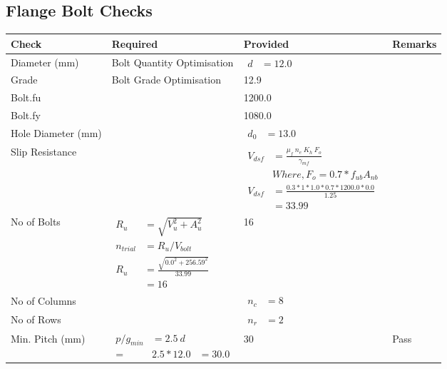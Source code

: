 \documentclass{article}%
\begin{document}
\subsection{Flange Bolt Checks}%
\label{subsec:FlangeBoltChecks}%
\renewcommand{\arraystretch}{1.2}%
\begin{longtable}{|p{4cm}|p{5cm}|p{5.5cm}|p{1.5cm}|}%
\hline%
\rowcolor{OsdagGreen}%
Check&Required&Provided&Remarks\\%
\hline%
\endhead%
\hline%
Diameter (mm)&Bolt Quantity Optimisation&$\begin{aligned} d &=12.0\end{aligned}$&\\%
\hline%
Grade&Bolt Grade Optimisation&12.9&\\%
\hline%
Bolt.fu&&1200.0&\\%
\hline%
Bolt.fy&&1080.0&\\%
\hline%
Hole Diameter (mm)& &$\begin{aligned} d_0 &=13.0\end{aligned}$&\\%
\hline%
Slip Resistance&&$\begin{aligned}V_{dsf} & = \frac{\mu_f~ n_e~  K_h~ F_o}{\gamma_{mf}}\\ & Where, F_o = 0.7 * f_{ub} A_{nb}\\ V_{dsf} & = \frac{0.3*1*1.0* 0.7 *1200.0*0.0}{1.25}\\ & =33.99\end{aligned}$&\\%
\hline%
No of Bolts&$\begin{aligned}R_{u} &= \sqrt{V_u^2+A_u^2}\\ n_{trial} &= R_u/ V_{bolt}\\ R_{u} &= \frac{\sqrt{0.0^2+256.59^2}}{33.99}\\ &=16\end{aligned}$&16&\\%
\hline%
No of Columns&&$\begin{aligned} n_c &=8\end{aligned}$&\\%
\hline%
No of Rows&&$\begin{aligned} n_r &=2\end{aligned}$&\\%
\hline%
Min. Pitch (mm)&$\begin{aligned}p/g_{min}&= 2.5 ~ d&\\ =&2.5*12.0&=30.0\end{aligned}$&30&Pass\\%

\end{longtable}
\end{document}
